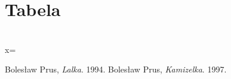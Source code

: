 \documentclass[11pt]{article}
\begin{document}
\newpage
\part{Tabela}

\\
x=\left[ \begin{array}{cccc}
1 & 2  & 3 \\
4} & 5  & 6 \\
\vdots  & \ddots & \vdots \\
7 & 8  & 9
\end{array} \right]

\newpage
\begin{thebibliography}{9}
Bolesław Prus,
\emph{Lalka}.
1994.
Bolesław Prus,
\emph{Kamizelka}.
1997.
\end{thebibliography}
\end{document}
